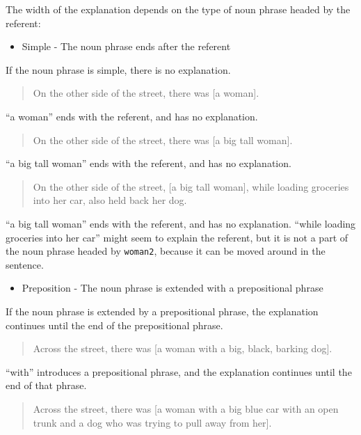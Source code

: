 \documentclass[
]{book}
\providecommand{\tightlist}{%
  \setlength{\itemsep}{0pt}\setlength{\parskip}{0pt}}
\begin{document}
The width of the explanation depends on the type of noun phrase headed by the referent:

\begin{itemize}
\tightlist
\item
  Simple - The noun phrase ends after the referent
\end{itemize}

If the noun phrase is simple, there is no explanation.

\begin{quote}
On the other side of the street,
there was {[}a woman{]}.
\end{quote}

``a woman'' ends with the referent, and has no explanation.

\begin{quote}
On the other side of the street,
there was {[}a big tall woman{]}.
\end{quote}

``a big tall woman'' ends with the referent, and has no explanation.

\begin{quote}
On the other side of the street,
{[}a big tall woman{]}, while loading groceries into her car,
also held back her dog.
\end{quote}

``a big tall woman'' ends with the referent, and has no explanation.
``while loading groceries into her car'' might seem to explain the referent,
but it is not a part of the noun phrase headed by \texttt{woman2},
because it can be moved around in the sentence.

\begin{itemize}
\tightlist
\item
  Preposition - The noun phrase is extended with a prepositional phrase
\end{itemize}

If the noun phrase is extended by a prepositional phrase,
the explanation continues until the end of the prepositional phrase.

\begin{quote}
Across the street,
there was {[}a woman with a big, black, barking dog{]}.
\end{quote}

``with'' introduces a prepositional phrase,
and the explanation continues until the end of that phrase.

\begin{quote}
Across the street,
there was {[}a woman with a big blue car with an open trunk
and a dog who was trying to pull away from her{]}.
\end{quote}
\end{document}
